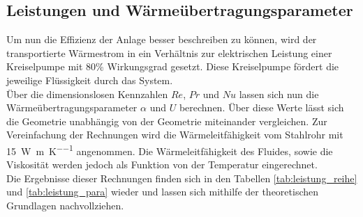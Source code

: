 \subsection{Leistungen und Wärmeübertragungsparameter}
Um nun die Effizienz der Anlage besser beschreiben zu können, wird der transportierte Wärmestrom in ein Verhältnis zur elektrischen Leistung einer Kreiselpumpe mit 80\% Wirkungsgrad gesetzt. Diese Kreiselpumpe fördert die jeweilige Flüssigkeit durch das System.\\
Über die dimensionslosen Kennzahlen $Re$, $Pr$ und $Nu$ lassen sich nun die Wärmeübertragungsparameter $\alpha $ und $U$ berechnen. Über diese Werte lässt sich die Geometrie unabhängig von der Geometrie miteinander vergleichen. Zur Vereinfachung der Rechnungen wird die Wärmeleitfähigkeit vom Stahlrohr mit \SI{15}{\watt\per\meter \per\kelvin} angenommen. Die Wärmeleitfähigkeit des Fluides, sowie die Viskosität werden jedoch als Funktion von der Temperatur eingerechnet.\\
Die Ergebnisse dieser Rechnungen finden sich in den Tabellen \ref{tab:leistung_reihe} und \ref{tab:leistung_para} wieder und lassen sich mithilfe der theoretischen Grundlagen nachvollziehen.
\begin{table}[h!]
	\centering
	\caption{Berechnete Leistungen, dimensionslose Kennzahlen und \linebreak Wärmeübertragungsparameter der Reihenschaltung}
	\label{tab:leistung_reihe}
\end{table}%
